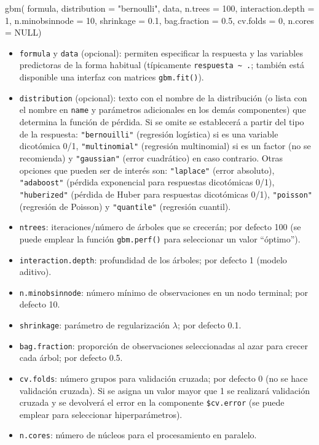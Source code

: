 \documentclass[
]{book}
\newenvironment{Shaded}{\begin{snugshade}}{\end{snugshade}}
\newcommand{\AttributeTok}[1]{\textcolor[rgb]{0.77,0.63,0.00}{#1}}
\newcommand{\ConstantTok}[1]{\textcolor[rgb]{0.00,0.00,0.00}{#1}}
\newcommand{\DecValTok}[1]{\textcolor[rgb]{0.00,0.00,0.81}{#1}}
\newcommand{\FloatTok}[1]{\textcolor[rgb]{0.00,0.00,0.81}{#1}}
\newcommand{\FunctionTok}[1]{\textcolor[rgb]{0.00,0.00,0.00}{#1}}
\newcommand{\NormalTok}[1]{#1}
\newcommand{\StringTok}[1]{\textcolor[rgb]{0.31,0.60,0.02}{#1}}
\theoremstyle{break}
\theoremstyle{definition}
\theoremstyle{definition}
\theoremstyle{definition}
\theoremstyle{definition}
\theoremstyle{remark}
\begin{document}
\begin{Shaded}
\begin{Highlighting}[]
\FunctionTok{gbm}\NormalTok{( formula, }\AttributeTok{distribution =} \StringTok{"bernoulli"}\NormalTok{, data, }\AttributeTok{n.trees =} \DecValTok{100}\NormalTok{, }
     \AttributeTok{interaction.depth =} \DecValTok{1}\NormalTok{, }\AttributeTok{n.minobsinnode =} \DecValTok{10}\NormalTok{,}
     \AttributeTok{shrinkage =} \FloatTok{0.1}\NormalTok{, }\AttributeTok{bag.fraction =} \FloatTok{0.5}\NormalTok{, }
     \AttributeTok{cv.folds =} \DecValTok{0}\NormalTok{, }\AttributeTok{n.cores =} \ConstantTok{NULL}\NormalTok{)}
\end{Highlighting}
\end{Shaded}

\begin{itemize}
\item
  \texttt{formula} y \texttt{data} (opcional): permiten especificar la respuesta y las variables predictoras de la forma habitual (típicamente \texttt{respuesta\ \textasciitilde{}\ .}; también está disponible una interfaz con matrices \texttt{gbm.fit()}).
\item
  \texttt{distribution} (opcional): texto con el nombre de la distribución (o lista con el nombre en \texttt{name} y parámetros adicionales en los demás componentes) que determina la función de pérdida.
  Si se omite se establecerá a partir del tipo de la respuesta: \texttt{"bernouilli"} (regresión logística) si es una variable dicotómica 0/1, \texttt{"multinomial"} (regresión multinomial) si es un factor (no se recomienda) y \texttt{"gaussian"} (error cuadrático) en caso contrario.
  Otras opciones que pueden ser de interés son: \texttt{"laplace"} (error absoluto), \texttt{"adaboost"} (pérdida exponencial para respuestas dicotómicas 0/1), \texttt{"huberized"} (pérdida de Huber para respuestas dicotómicas 0/1), \texttt{"poisson"} (regresión de Poisson) y \texttt{"quantile"} (regresión cuantil).
\item
  \texttt{ntrees}: iteraciones/número de árboles que se crecerán; por defecto 100 (se puede emplear la función \texttt{gbm.perf()} para seleccionar un valor ``óptimo'').
\item
  \texttt{interaction.depth}: profundidad de los árboles; por defecto 1 (modelo aditivo).
\item
  \texttt{n.minobsinnode}: número mínimo de observaciones en un nodo terminal; por defecto 10.
\item
  \texttt{shrinkage}: parámetro de regularización \(\lambda\); por defecto 0.1.
\item
  \texttt{bag.fraction}: proporción de observaciones seleccionadas al azar para crecer cada árbol; por defecto 0.5.
\item
  \texttt{cv.folds}: número grupos para validación cruzada; por defecto 0 (no se hace validación cruzada). Si se asigna un valor mayor que 1 se realizará validación cruzada y se devolverá el error en la componente \texttt{\$cv.error} (se puede emplear para seleccionar hiperparámetros).
\item
  \texttt{n.cores}: número de núcleos para el procesamiento en paralelo.
\end{itemize}
\end{document}

